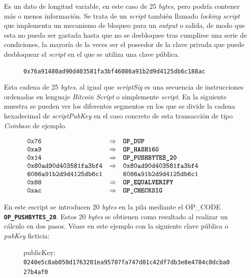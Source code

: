 \documentclass{article}
\begin{document}
    Es un dato de longitud variable, en este caso de 25 \textit{bytes}, pero podría contener más o menos información. Se trata de un \textit{script} también llamado \textit{locking script} que implementa un mecanismo de bloqueo para un \textit{output} o salida, de modo que esta no pueda ser gastada hasta que no se desbloquee tras cumplirse una serie de condiciones, la mayoría de la veces ser el poseedor de la clave privada que puede desbloquear el \textit{script} en el que se utiliza una clave pública.
    
    \begin{figure}[H]
        \texttt{0x76a91480ad90d403581fa3bf46086a91b2d9d4125db6c188ac}
    \end{figure}
    
    Esta cadena de 25 \textit{bytes}, al igual que \textit{scriptSig} es una secuencia de instrucciones ordenadas en lenguaje \textit{Bitcoin Script} o simplemente \textit{script}. En la siguiente muestra se pueden ver los diferentes segmentos en los que se divide la cadena hexadecimal de \textit{scriptPubKey} en el caso concreto de esta transacción de tipo \textit{Coinbase} de ejemplo.
    
    \begin{figure}[H]
        $\begin{array}{lcl}
            \texttt{0x76} & \Rightarrow & \textbf{\texttt{OP\_DUP}} \\
            \texttt{0xa9} & \Rightarrow & \textbf{\texttt{OP\_HASH160}}\\
            \texttt{0x14} & \Rightarrow & \textbf{\texttt{OP\_PUSHBYTES\_20}} \\
            \texttt{0x80ad90d403581fa3bf4} & \Rightarrow & \texttt{0x80ad90d403581fa3bf4} \\
            \texttt{6086a91b2d9d4125db6c1} & & \texttt{6086a91b2d9d4125db6c1} \\
            \texttt{0x88} & \Rightarrow & \textbf{\texttt{OP\_EQUALVERIFY}} \\
            \texttt{0xac} & \Rightarrow & \textbf{\texttt{OP\_CHECKSIG}}
        \end{array}$
    \end{figure}
    En este escript se introducen 20 \textit{bytes} en la pila mediante el OP\_CODE \textbf{\texttt{OP\_PUSHBYTES\_20}}. Estos 20 \textit{bytes} se obtienen como resultado al realizar un cálculo en dos pasos. Véase en este ejemplo con la siguiente clave pública o \textit{pubKey} ficticia:
    
    \begin{figure}[H]
    \centering
        \scriptsize{publicKey: \texttt{0240e5c8ab050d1763201ea95707fa747d01c42df7db3e8e4784c0dcba027b4af0}}
    \end{figure}
    
\end{document}
